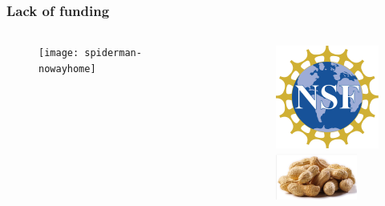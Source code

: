 \documentclass[hide notes,intlimits]{beamer}
\begin{document}
\begin{frame}
 \frametitle{Lack of funding}
  \begin{columns}[c]
    \begin{column}{.5\linewidth}
      \begin{figure}
        \texttt{[image: spiderman-nowayhome]}
      \end{figure}
    \end{column}
    \begin{column}{.5\linewidth}
      \begin{figure}
        \includegraphics[height=3.5cm]{nsf_logo_color} \\[0.25em]
        \includegraphics[height=1.5cm]{peanuts} 
      \end{figure}
    \end{column}
  \end{columns}
  \vspace{1em}
\end{frame}

  
  {
}

\begin{frame}{}
\end{frame}
\end{document}
